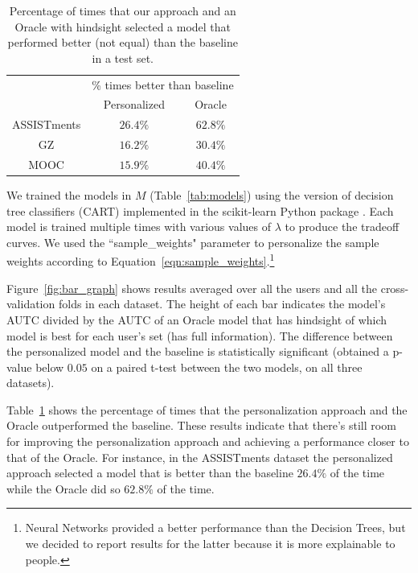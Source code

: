 \documentclass[letterpaper]{article}
\theoremstyle{definition}
\begin{document}
\begin{table}[t]
\begin{center}
{
\setlength{\tabcolsep}{4pt}
\begin{tabular}{c|cc}
\hline
\rule{0pt}{12pt}
\multirow{2}{*}{Dataset}&\multicolumn{2}{c}{\% times better than baseline}\\
\rule{0pt}{12pt}
& Personalized& Oracle
\\\hline
\rule{0pt}{12pt}ASSISTments&$26.4\%$&$62.8\%$\\
\rule{0pt}{12pt}GZ&$16.2\%$&$30.4\%$\\
\rule{0pt}{12pt}MOOC&$15.9\%$&$40.4\%$\\
\hline
\end{tabular}
\caption{Percentage of times that our approach and an Oracle with hindsight selected a model that performed better (not equal) than the baseline in a test set.}
\label{tab:agent_results}}
\end{center}
\end{table}

We trained the models in $M$ (Table~\ref{tab:models}) using the version of decision tree classifiers (CART) implemented in the scikit-learn Python package \cite{scikit-learn}. Each model is trained multiple times with various values of $\lambda$ to produce the tradeoff curves.
We  used the ``sample\_weights" parameter to personalize the sample weights  according to Equation~\ref{eqn:sample_weights}.\footnote{Neural Networks provided a better performance than the Decision Trees, but we decided to report results for the latter because it is more explainable to people.}

Figure~\ref{fig:bar_graph} shows results averaged over all the users and all the cross-validation folds in each dataset. The height of each bar indicates the model's AUTC divided by the AUTC of an Oracle model that has hindsight of which model is best for each user's set (has full information).
The difference between the personalized model and the baseline is statistically significant (obtained a p-value below $0.05$ on a paired t-test between the two models, on all three datasets).

Table~\ref{tab:agent_results} shows the percentage of times that the personalization approach and the Oracle outperformed the baseline. These results indicate that there's still room for improving the personalization approach and achieving a performance closer to that of the Oracle. For instance, in the ASSISTments dataset the personalized approach selected a model that is better than the baseline $26.4\%$ of the time while the Oracle did so $62.8\%$ of the time.
\end{document}
